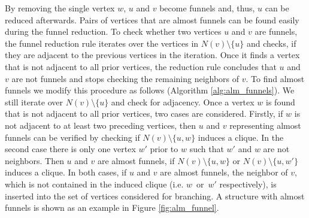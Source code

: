 \documentclass[12pt,a4paper,twoside]{scrartcl}
\numberwithin{equation}{section}
\begin{document}
By removing the single vertex $w$, $u$ and $v$ become funnels and, thus, $u$ can be reduced afterwards. Pairs of vertices that are almost funnels can be found easily during the funnel reduction. To check whether two vertices $u$ and $v$ are funnels, the funnel reduction rule iterates over the vertices in $N(v)\setminus \{u\}$ and checks, if they are adjacent to the previous vertices in the iteration. Once it finds a vertex that is not adjacent to all prior vertices, the reduction rule concludes that $u$ and $v$ are not funnels and stops checking the remaining neighbors of $v$. To find almost funnels we modify this procedure as follows (Algorithm \ref{alg:alm_funnels}). We still iterate over $N(v)\setminus\{u\}$ and check for adjacency. Once a vertex $w$ is found that is not adjacent to all prior vertices, two cases are considered. Firstly, if $w$ is not adjacent to at least two preceding vertices, then $u$ and $v$ representing almost funnels can be verified by checking if $N(v)\setminus\{u,w\}$ induces a clique. In the second case there is only one vertex $w'$ prior to $w$ such that $w'$ and $w$ are not neighbors. Then $u$ and $v$ are almost funnels, if $N(v)\setminus\{u,w\}$ or $N(v)\setminus\{u,w'\}$ induces a clique. In both cases, if $u$ and $v$ are almost funnels, the neighbor of $v$, which is not contained in the induced clique (i.e. $w$~or~$w'$ respectively), is inserted into the set of vertices considered for branching. A structure with almost funnels is shown as an example in Figure \ref{fig:alm_funnel}.
\end{document}
